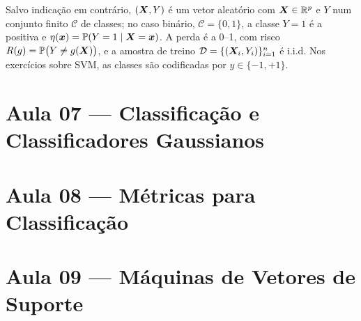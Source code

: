 \documentclass[11pt,a4paper]{article}
\begin{document}

\medskip\noindent
Salvo indicação em contrário, $(\bm{X},Y)$ é um vetor aleatório com $\bm{X}\in\mathbb{R}^p$ e $Y$ num
conjunto finito $\mathcal{C}$ de classes; no caso binário, $\mathcal{C}=\{0,1\}$, a classe
$Y=1$ é a positiva e $\eta(\bm{x})=\mathbb{P}(Y=1\mid\bm{X}=\bm{x})$. A perda é a 0--1, com risco
$R(g)=\mathbb{P}\big(Y\ne g(\bm{X})\big)$, e a amostra de treino
$\mathcal{D}=\{(\bm{X}_i,Y_i)\}_{i=1}^n$ é i.i.d. Nos exercícios sobre SVM,
as classes são codificadas por $y\in\{-1,+1\}$.

\section*{Aula 07 --- Classificação e Classificadores Gaussianos}

\begin{exercicio}
\label{ex:07-logistica}

\end{exercicio}

\begin{exercicio}
\label{ex:07-ingenuo}

\end{exercicio}

\section*{Aula 08 --- Métricas para Classificação}

\begin{exercicio}
\label{ex:08-sorteio}

\end{exercicio}

\begin{exercicio}
\label{ex:08-exame}

\end{exercicio}

\section*{Aula 09 --- Máquinas de Vetores de Suporte}
\end{document}

